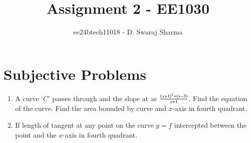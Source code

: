 \documentclass[journal]{IEEEtran}
\begin{document}

\vspace{3cm}

\title{Assignment 2 - EE1030}
\author{ee24btech11018 - D. Swaraj Sharma}

{\let\newpage\relax\maketitle}
\renewcommand{\thefigure}{\theenumi}
\renewcommand{\thetable}{\theenumi}
\setlength{\intextsep}{10pt}
\renewcommand{\thetable}{\theenumi}
\section{Subjective Problems}
\begin{enumerate}[label={\arabic*.}]
	\item A curve `$C$' passes through  and the slope at  as $\frac{\left(x+1\right)^2+\left(y-3\right)}{x+1}$. Find the equation of the curve. Find the area bounded by curve and $x$-axis in fourth quadrant.  

		\hfill{}
\item If length of tangent at any point on the curve $y=f$ intercepted between the point and the $x$-axis in fourth quadrant. 

	\hfill{}
\end{enumerate}
\end{document}
